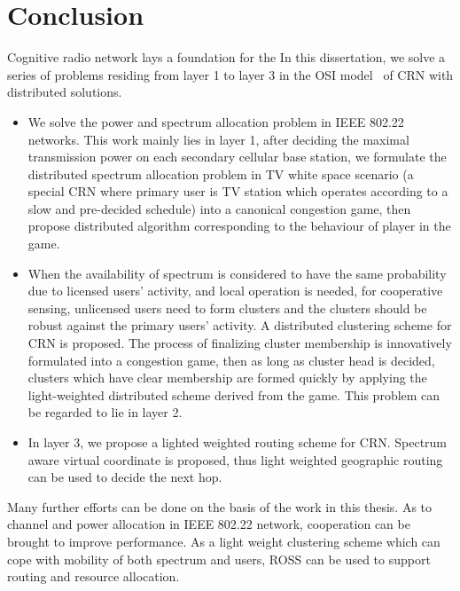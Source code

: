 \chapter{Conclusion}
Cognitive radio network lays a foundation for the 
In this dissertation, we solve a series of problems residing from layer 1 to layer 3 in the OSI model~\cite{osi} of CRN with distributed solutions.
\begin{itemize}
\item We solve the power and spectrum allocation problem in IEEE 802.22 networks.
This work mainly lies in layer 1, after deciding the maximal transmission power on each secondary cellular base station, we formulate the distributed spectrum allocation problem in TV white space scenario (a special CRN where primary user is TV station which operates according to a slow and pre-decided schedule) into a canonical congestion game, then propose distributed algorithm corresponding to the behaviour of player in the game.

\item 
When the availability of spectrum is considered to have the same probability due to licensed users' activity, and local operation is needed, \ie for cooperative sensing, unlicensed users need to form clusters and the clusters should be robust against the primary users' activity.
A distributed clustering scheme for CRN is proposed. 
The process of finalizing cluster membership is innovatively formulated into a congestion game, then as long as cluster head is decided, clusters which have clear membership are formed quickly by applying the  light-weighted distributed scheme derived from the game.
This problem can be regarded to lie in layer 2.

\item In layer 3, we propose a lighted weighted routing scheme for CRN. 
Spectrum aware virtual coordinate is proposed, thus light weighted geographic routing can be used to decide the next hop.
\end{itemize}

Many further efforts can be done on the basis of the work in this thesis.
As to channel and power allocation in IEEE 802.22 network, cooperation can be brought to improve performance. 
As a light weight clustering scheme which can cope with mobility of both spectrum and users, ROSS can be used to support routing and resource allocation.



